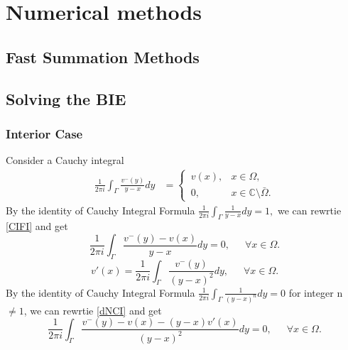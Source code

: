 \documentclass[preprint, 10pt]{elsarticle}
\newcommand{\Cdb}{\mbox{$\mathbb{C}$}}
\begin{document}
\section{Numerical methods}
\label{s:method}

\subsection{Fast Summation Methods}
\label{sec:FMM}

\subsection{Solving the BIE}
\label{sec:BIE}
\subsubsection{Interior Case}
Consider a Cauchy integral 
\begin{align}\label{CIFI}
\frac{1}{2\pi i}\int_{\Gamma}\frac{v^-({ y})}{{ y}-{ x}} d{ y}
&=\begin{cases}
\,v(x), &{ x} \in \Omega,\\ 
\,0,  &{ x} \in \Cdb\setminus \bar{\Omega}.
\end{cases}
\end{align}
By the identity of Cauchy Integral Formula $\displaystyle\frac{1}{2 \pi i}\int_{\Gamma}\frac{1}{{ y}-{ x}} d{ y}=1,$ we can rewrtie \eqref{CIFI} and get 
\begin{equation}
\frac{1}{2\pi i}\int_{\Gamma}\frac{v^-({ y})-v(x)}{{ y}-{ x}} d{ y}=0,\,\,\,\,\,\,\,\,\, \forall { x} \in \Omega.
\end{equation}
\begin{equation}\label{dNCI}
v'({x})=\frac{1}{2\pi i}\int_{\Gamma}\frac{v^-({ y})}{(y- x)^2} d{ y},\,\,\,\,\,\,\,\,\, \forall { x} \in \Omega.
\end{equation}
By the identity of Cauchy Integral Formula $\displaystyle\frac{1}{2 \pi i}\int_{\Gamma}\frac{1}{( y- x)^n} d{ y}=0$ for integer n $\neq 1$, we can rewrtie \eqref{dNCI} and get 
\begin{equation}
\frac{1}{2\pi i}\int_{\Gamma}\frac{v^-({ y})-v(x)-(y-x)v'(x)}{(y-x)^2} d{ y}=0,\,\,\,\,\,\,\,\,\, \forall { x} \in \Omega.
\end{equation}
\end{document}
